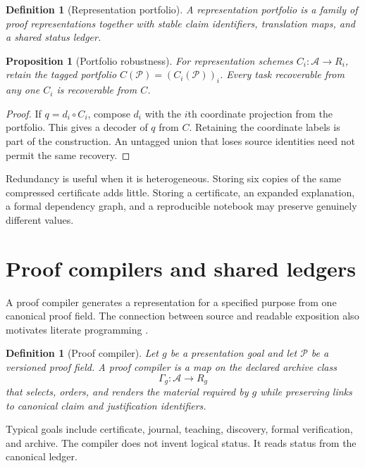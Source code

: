 \documentclass[11pt,oneside]{article}
\theoremstyle{komorebiplain}
\newtheorem{proposition}[theorem]{Proposition}
\theoremstyle{komorebidefinition}
\newtheorem{definition}[theorem]{Definition}
\theoremstyle{komorebiremark}
\newcommand{\Pcal}{\mathcal P}
\begin{document}
\begin{definition}[Representation portfolio]
\label{res:11:1}
A representation portfolio is a family of proof representations together with stable claim identifiers, translation maps, and a shared status ledger.
\end{definition}

\begin{proposition}[Portfolio robustness]
\label{res:11:2}
For representation schemes $C_i:\mathscr A\to R_i$, retain the tagged portfolio $C(\Pcal)=(C_i(\Pcal))_i$. Every task recoverable from any one $C_i$ is recoverable from $C$.
\end{proposition}

\begin{proof}
If $q=d_i\circ C_i$, compose $d_i$ with the $i$th coordinate projection from the portfolio. This gives a decoder of $q$ from $C$. Retaining the coordinate labels is part of the construction. An untagged union that loses source identities need not permit the same recovery.
\end{proof}

Redundancy is useful when it is heterogeneous. Storing six copies of the same compressed certificate adds little. Storing a certificate, an expanded explanation, a formal dependency graph, and a reproducible notebook may preserve genuinely different values.


\section{Proof compilers and shared ledgers}
\label{sec:old12}

A proof compiler generates a representation for a specified purpose from one canonical proof field. The connection between source and readable exposition also motivates literate programming \cite{knuth}.

\begin{definition}[Proof compiler]
\label{res:12:1}
Let $g$ be a presentation goal and let $\Pcal$ be a versioned proof field. A proof compiler is a map on the declared archive class
\[
\Gamma_g:\mathscr A\longrightarrow R_g
\]
that selects, orders, and renders the material required by $g$ while preserving links to canonical claim and justification identifiers.
\end{definition}

Typical goals include certificate, journal, teaching, discovery, formal verification, and archive. The compiler does not invent logical status. It reads status from the canonical ledger.
\end{document}
